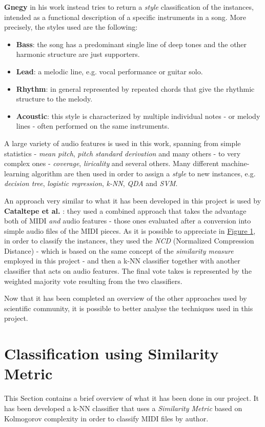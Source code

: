 \documentclass[a4paper]{article}
\begin{document}
	\textbf{Gnegy} in his work \cite{chet} instead tries to return a \textit{style} classification of the instances, intended as a functional description of a specific instruments in a song. More precisely, the styles used are the following: 
	\begin{itemize}
		\item \textbf{Bass}: the song has a predominant single line of deep tones and the other harmonic structure are just supporters.
		\item \textbf{Lead}: a melodic line, e.g. vocal performance or guitar solo.
		\item \textbf{Rhythm}: in general represented by repeated chords that give the rhythmic structure to the melody.
		\item \textbf{Acoustic}: this style is characterized by multiple individual notes - or melody lines - often performed on the same instruments.
	\end{itemize}
	A large variety of audio features is used in this work, spanning from simple statistics - \textit{mean pitch}, \textit{pitch standard derivation} and many others - to very complex ones - \textit{coverage}, \textit{liricality} and several others. Many different machine-learning algorithm are then used in order to assign a \textit{style} to new instances, e.g. \textit{decision tree}, \textit{logistic regression}, \textit{k-NN}, \textit{QDA} and \textit{SVM}.
	
	An approach very similar to what it has been developed in this project is used by \textbf{Cataltepe et al.} \cite{catelape}: they used a combined approach that takes the advantage both of MIDI \textit{and} audio features - those ones evaluated after a conversion into simple audio files of the MIDI pieces. As it is possible to appreciate in \hyperref[fig:audio_and_NCD]{Figure 1}, in order to classify the instances, they used the \textit{NCD}  (Normalized Compression Distance) - which is based on the same concept of the \textit{similarity measure} employed in this project - and then a k-NN classifier together with another classifier that acts on audio features. The final vote takes is represented by the weighted majority vote resulting from the two classifiers.
	
	Now that it has been completed an overview of the other approaches used by scientific community, it is possible to better analyse the techniques used in this project.
	
	
	\section{Classification using Similarity Metric}
	\lettrine[nindent=0em,lines=2]{T}{}his Section contains a brief overview of what it has been done in our project. It has been developed a k-NN classifier that uses a  \textit{Similarity Metric} based on Kolmogorov complexity in order to classify MIDI files by author. 
	
\end{document}
